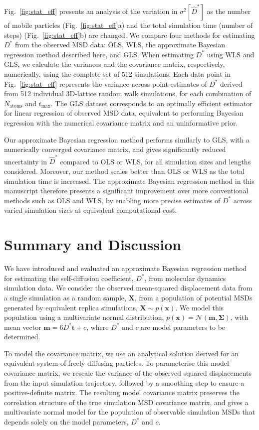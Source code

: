\documentclass[reprint,superscriptaddress,nobibnotes,amsmath,amssymb,aps,prx,hidelinks,linenumbers]{revtex4-2}
\newcommand{\oMSD}{\ensuremath{\bm{x}}}
\newcommand{\model}{\bm{m}}
\newcommand{\Dest}{\ensuremath{\widehat{D}^*}}
\newcommand{\D}{\ensuremath{D^*}}
\newcommand{\var}[1]{\ensuremath{\sigma^2[#1]}}
\begin{document}
Fig.~\ref{fig:stat_eff} presents an analysis of the variation in $\var{\Dest}$ as the number of mobile particles (Fig.~\ref{fig:stat_eff}a) and the total simulation time (number of steps) (Fig.~\ref{fig:stat_eff}b) are changed.
We compare four methods for estimating $\D$ from the observed MSD data: OLS, WLS, the approximate Bayesian regression method described here, and GLS.
When estimating $\D$ using WLS and GLS, we calculate the variances and the covariance matrix, respectively, numerically, using the complete set of \num{512} simulations.
Each data point in Fig.~\ref{fig:stat_eff} represents the variance across point-estimates of $\D$ derived from \num{512} individual 3D-lattice random walk simulations, for each combination of $N_\mathrm{atoms}$ and $t_\mathrm{max}$.
The GLS dataset corresponds to an optimally efficient estimator for linear regression of observed MSD data, equivalent to performing Bayesian regression with the numerical covariance matrix and an uninformative prior.

Our approximate Bayesian regression method performs similarly to GLS, with a numerically converged covariance matrix, and gives significantly reduced uncertainty in $\Dest$ compared to OLS or WLS, for all simulation sizes and lengths considered.
Moreover, our method scales better than OLS or WLS as the total simulation time is increased.
The approximate Bayesian regression method in this manuscript therefore presents a significant improvement over more conventional methods such as OLS and WLS, by enabling more precise estimates of $\D$ across varied simulation sizes at equivalent computational cost.

\section{Summary and Discussion}

We have introduced and evaluated an approximate Bayesian regression method for estimating the self-diffusion coefficient, $\D$, from molecular dynamics simulation data.
We consider the observed mean-squared displacement data from a single simulation as a random sample, $\bm{X}$, from a population of potential MSDs generated by equivalent replica simulations, $\bm{X}\sim p(\oMSD)$.
We model this population using a multivariate normal distribution, $p(\oMSD) = \mathcal{N}(\model, \mathbf{\Sigma})$, with mean vector $\model = 6\D\bm{t} + c$, where $\D$ and $c$ are model parameters to be determined.

To model the covariance matrix, we use an analytical solution derived for an equivalent system of freely diffusing particles.
To parameterise this model covariance matrix, we rescale the variance of the observed squared displacements from the input simulation trajectory, followed by a smoothing step to ensure a positive-definite matrix.
The resulting model covariance matrix preserves the correlation structure of the true simulation MSD covariance matrix, and gives a multivariate normal model for the population of observable simulation MSDs that depends solely on the model parameters, $\D$ and $c$.
\end{document}
